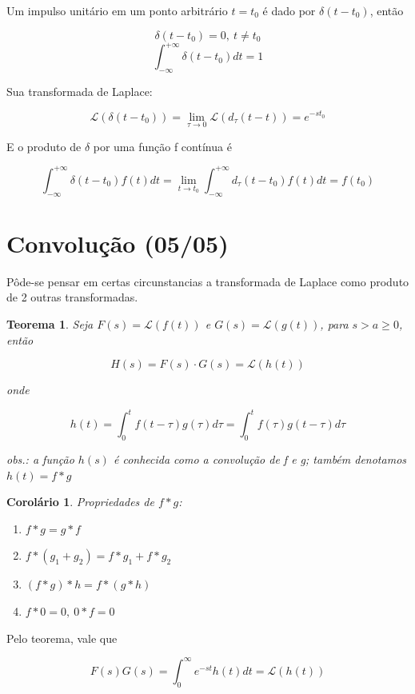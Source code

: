 \documentclass[12pt]{article}
\newtheorem{theorem}{Teorema}[section]
\newtheorem{corollary}{Corolário}[theorem]
\begin{document}
Um impulso unitário em um ponto arbitrário $t = t_0$ é dado por $\delta (t - t_0)$, então

$$\delta (t - t_0) = 0, \ t \neq t_0$$
$$\int_{- \infty}^{+ \infty} \delta (t - t_0) d t = 1$$

Sua transformada de Laplace:

$$\mathscr{L}(\delta(t - t_0)) = \lim_{\tau \xrightarrow{} 0} \mathscr{L}(d_\tau (t - t)) = e^{- st_0}$$

E o produto de $\delta$ por uma função f contínua é

$$\int_{- \infty}^{+ \infty} \delta (t - t_0) f(t) d t = \lim_{t \xrightarrow{} t_0} \int_{- \infty}^{+ \infty} d_\tau (t - t_0) f(t) d t = f(t_0)$$

\section{Convolução (05/05)}
Pôde-se pensar em certas circunstancias a transformada de Laplace como produto de 2 outras transformadas.

\begin{theorem}
    Seja $F(s) = \mathscr{L}(f(t))$ e $G(s) = \mathscr{L} (g(t))$, para $s > a \geq 0$, então
    
    $$H(s) = F(s) \cdot G(s) = \mathscr{L}(h(t))$$
    
    onde 
    
    $$h(t) = \int_0^t f(t - \tau) g(\tau) d \tau = \int_0^t f(\tau) g(t - \tau) d \tau$$
    
    obs.: a função $h(s)$ é conhecida como a convolução de f e g; também denotamos $h(t) = f * g$
\end{theorem}

\begin{corollary}
    Propriedades de $f * g$:
    
    \begin{enumerate}
        \item $f * g = g * f$
        \item $f * (g_1 + g_2) = f * g_1 + f * g_2$
        \item $(f * g) * h = f * (g * h)$
        \item $f * 0 = 0, \ 0 * f = 0$
    \end{enumerate}
\end{corollary}

Pelo teorema, vale que

$$F(s) G(s) = \int_0^\infty e^{- st} h(t) d t = \mathscr{L}(h(t))$$
\end{document}
